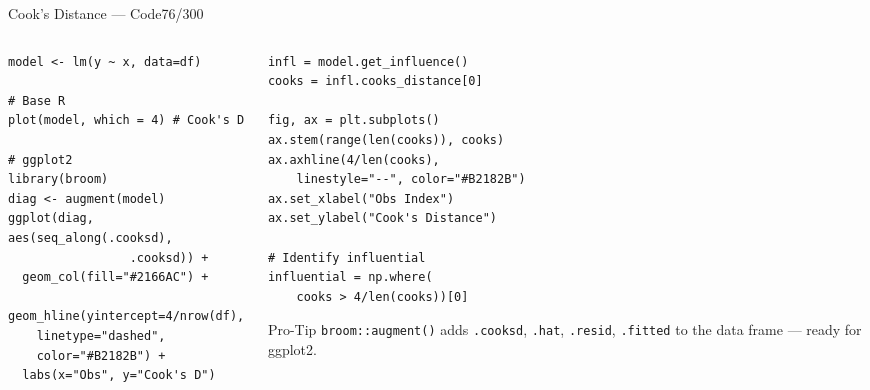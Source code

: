 \documentclass[10pt]{beamer}
\newcommand{\smark}[1]{\hfill{\scriptsize\color{codegray}#1}}
\begin{document}
\begin{frame}[fragile]{Cook's Distance --- Code}\smark{76/300}
\begin{columns}[T]
\begin{column}{0.48\textwidth}
\begin{lstlisting}[style=Rstyle]
model <- lm(y ~ x, data=df)

# Base R
plot(model, which = 4) # Cook's D

# ggplot2
library(broom)
diag <- augment(model)
ggplot(diag, aes(seq_along(.cooksd),
                 .cooksd)) +
  geom_col(fill="#2166AC") +
  geom_hline(yintercept=4/nrow(df),
    linetype="dashed",
    color="#B2182B") +
  labs(x="Obs", y="Cook's D")
\end{lstlisting}
\end{column}
\begin{column}{0.48\textwidth}
\begin{lstlisting}[style=Pystyle]
infl = model.get_influence()
cooks = infl.cooks_distance[0]

fig, ax = plt.subplots()
ax.stem(range(len(cooks)), cooks)
ax.axhline(4/len(cooks),
    linestyle="--", color="#B2182B")
ax.set_xlabel("Obs Index")
ax.set_ylabel("Cook's Distance")

# Identify influential
influential = np.where(
    cooks > 4/len(cooks))[0]
\end{lstlisting}
\vspace{0.1cm}
\begin{alertblock}{Pro-Tip}
    \scriptsize \texttt{broom::augment()} adds \texttt{.cooksd}, \texttt{.hat}, \texttt{.resid}, \texttt{.fitted} to the data frame --- ready for ggplot2.
\end{alertblock}
\end{column}
\end{columns}
\end{frame}
\end{document}
